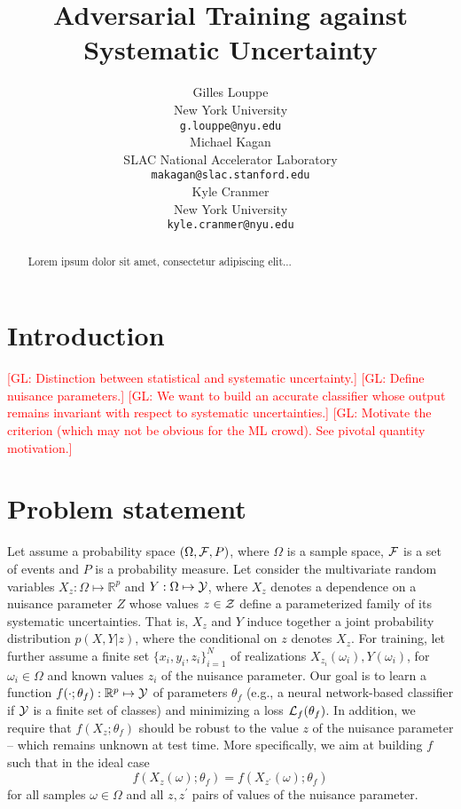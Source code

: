 \documentclass{article}
\title{Adversarial Training against Systematic Uncertainty}
\author{
  Gilles Louppe \\
  New York University\\
  \texttt{g.louppe@nyu.edu} \\
  \And
  Michael Kagan\\
  SLAC National Accelerator Laboratory\\
  \texttt{makagan@slac.stanford.edu}\\
  \And
  Kyle Cranmer \\
  New York University\\
  \texttt{kyle.cranmer@nyu.edu}
}
\newcommand{\glnote}[1]{\textcolor{red}{[GL: #1]}}
\theoremstyle{plain}
\begin{document}
\maketitle


\begin{abstract}

Lorem ipsum dolor sit amet, consectetur adipiscing elit...

\end{abstract}



\section{Introduction}

\glnote{Distinction between statistical and systematic uncertainty.}
\glnote{Define nuisance parameters.}
\glnote{We want to build an accurate classifier whose output remains invariant with
respect to systematic uncertainties.}
\glnote{Motivate the criterion (which may not be obvious for the ML crowd). See pivotal quantity motivation.}



\section{Problem statement}
\label{sec:problem}

Let assume a probability space $(\Omega, {\cal F}, P)$, where $\Omega$ is a
sample space, ${\cal F}$ is a set of events and $P$ is a probability measure.
Let consider the multivariate random variables $X_z: \Omega \mapsto
\mathbb{R}^p$ and $Y: \Omega \mapsto {\cal Y}$, where $X_z$ denotes a dependence on a
nuisance parameter $Z$ whose values $z \in {\cal Z}$  define a
parameterized family of its systematic uncertainties. That is, $X_z$ and
$Y$ induce together a joint probability distribution $p(X,Y|z)$, where the
conditional on $z$ denotes $X_z$. For training, let further assume a
finite set $\{ x_i, y_i, z_i \}_{i=1}^N$ of realizations
$X_{z_i}(\omega_i), Y(\omega_i)$, for $\omega_i \in \Omega$ and known
values $z_i$ of the nuisance parameter. Our goal is to learn a function
$f(\cdot;\theta_f) : \mathbb{R}^p \mapsto {\cal Y}$ of parameters $\theta_f$
(e.g., a neural network-based classifier if ${\cal Y}$ is a finite set of
classes) and minimizing  a loss ${\cal L}_f(\theta_f)$. In addition, we require
that $f(X_z ; \theta_f)$ should be robust to the value $z$ of the nuisance parameter  --
which remains unknown at test time. More specifically, we aim at building $f$
such that in the ideal case
\begin{equation}\label{eqn:criterion-true}
f(X_{z}(\omega) ; \theta_f) = f(X_{z^\prime}(\omega) ; \theta_f)
\end{equation} for all
samples $\omega \in \Omega$ and all $z, z^\prime$ pairs of values of the
nuisance parameter.
\end{document}
